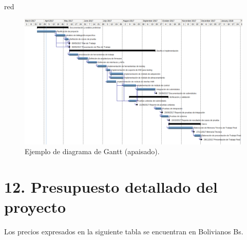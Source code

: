 \documentclass[
11pt, %
codirector, %
]{charter}
\begin{document}
\begin{consigna}{red}
\begin{landscape}
\begin{figure}[htpb]
\centering 
\includegraphics[height=.85\textheight]{./Figuras/Gantt-2.png}
\caption{Ejemplo de diagrama de Gantt (apaisado).} %
\label{fig:diagGantt}
\end{figure}

\end{landscape}

\end{consigna}


\section{12. Presupuesto detallado del proyecto}
\label{sec:presupuesto}
Los precios expresados en la siguiente tabla se encuentran en Bolivianos Bs.
\end{document}
